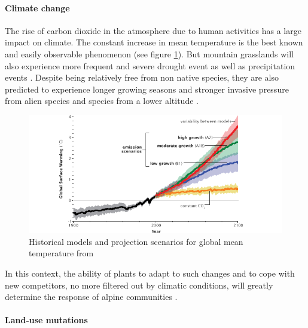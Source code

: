 \paragraph{Climate change}

The rise of carbon dioxide in the atmosphere due to human activities has a large impact on climate. The constant increase in mean temperature is the best known and easily observable phenomenon (see figure \ref{fig:climate}). But mountain grasslands will also experience more frequent and severe drought event as well as precipitation events \parencite{beniston_climate_1997, solomon_climate_2007, intergovernmental_panel_on_climate_change_climate_2014}. Despite being relatively free from non native species, they are also predicted to experience longer growing seasons and stronger invasive pressure from alien species and species from a lower altitude \cite{alexander_plant_2016}.


\begin{figure}
    \includegraphics[width=1\linewidth]{./1_Introduction/graphics/ipcc_scenarios.png}
  \caption[IPCC scenarios for global mean temperature]{Historical models and projection scenarios for global mean temperature from \cite{solomon_climate_2007} }
  \label{fig:climate}
\end{figure}

In this context, the ability of plants to adapt to such changes and to cope with new competitors, no more filtered out by climatic conditions, will greatly determine the response of alpine communities \parencite{alexander_novel_2015}.

\paragraph{Land-use mutations}

